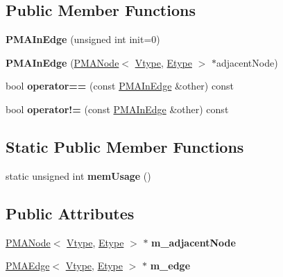 \subsection*{Public Member Functions}
\begin{DoxyCompactItemize}
\item 
\hypertarget{class_p_m_a_in_edge_afb2585b1000078e3eba24d5ca9143c27}{
{\bfseries PMAInEdge} (unsigned int init=0)}
\label{class_p_m_a_in_edge_afb2585b1000078e3eba24d5ca9143c27}

\item 
\hypertarget{class_p_m_a_in_edge_a828fff128f59e717e48e8874359184e8}{
{\bfseries PMAInEdge} (\hyperlink{class_p_m_a_node}{PMANode}$<$ \hyperlink{class_vtype}{Vtype}, \hyperlink{class_etype}{Etype} $>$ $\ast$adjacentNode)}
\label{class_p_m_a_in_edge_a828fff128f59e717e48e8874359184e8}

\item 
\hypertarget{class_p_m_a_in_edge_a13b80629c2eb2d48490dd12057eedc4a}{
bool {\bfseries operator==} (const \hyperlink{class_p_m_a_in_edge}{PMAInEdge} \&other) const }
\label{class_p_m_a_in_edge_a13b80629c2eb2d48490dd12057eedc4a}

\item 
\hypertarget{class_p_m_a_in_edge_a16c90e3a1310bdfe6251d46335fe09a3}{
bool {\bfseries operator!=} (const \hyperlink{class_p_m_a_in_edge}{PMAInEdge} \&other) const }
\label{class_p_m_a_in_edge_a16c90e3a1310bdfe6251d46335fe09a3}

\end{DoxyCompactItemize}
\subsection*{Static Public Member Functions}
\begin{DoxyCompactItemize}
\item 
\hypertarget{class_p_m_a_in_edge_a933228f4001dc1e5ec15ce189bef64ca}{
static unsigned int {\bfseries memUsage} ()}
\label{class_p_m_a_in_edge_a933228f4001dc1e5ec15ce189bef64ca}

\end{DoxyCompactItemize}
\subsection*{Public Attributes}
\begin{DoxyCompactItemize}
\item 
\hypertarget{class_p_m_a_in_edge_ace01d9c3f897c2149680d212940757f1}{
\hyperlink{class_p_m_a_node}{PMANode}$<$ \hyperlink{class_vtype}{Vtype}, \hyperlink{class_etype}{Etype} $>$ $\ast$ {\bfseries m\_\-adjacentNode}}
\label{class_p_m_a_in_edge_ace01d9c3f897c2149680d212940757f1}

\item 
\hypertarget{class_p_m_a_in_edge_a8dbe981ff23b7c7dcc36ec8900528083}{
\hyperlink{class_p_m_a_edge}{PMAEdge}$<$ \hyperlink{class_vtype}{Vtype}, \hyperlink{class_etype}{Etype} $>$ $\ast$ {\bfseries m\_\-edge}}
\label{class_p_m_a_in_edge_a8dbe981ff23b7c7dcc36ec8900528083}

\end{DoxyCompactItemize}
